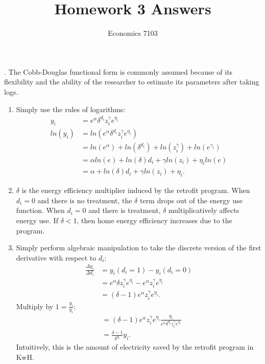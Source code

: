 \documentclass{article}
\title{Homework 3 Answers}
\author{Economics 7103}
\date{}
\begin{document}
  
\maketitle

. The Cobb-Douglas functional form is commonly assumed because of its flexibility and the ability of the researcher to estimate its parameters after taking logs.
\begin{enumerate}[label=(\alph*)]
    \item Simply use the rules of logarithms:
    \begin{align}
        y_i &= e^{\alpha} \delta^{d_i} z_i^{\gamma}  e^{\eta_i} \\
        ln(y_i) &= ln\left( e^{\alpha} \delta^{d_i} z_i^{\gamma}  e^{\eta_i} \right) \\
        & = ln\left( e^{\alpha} \right) + ln\left( \delta^{d_i} \right) + ln\left( z_i^\gamma \right) + ln\left( e^{\gamma_i} \right) \\
        & = \alpha ln(e) + ln(\delta)d_i + \gamma ln(z_i) + \eta_i ln(e) \\
        & = \alpha + ln(\delta) d_i + \gamma ln(z_i) + \eta_i.
    \end{align}
    \item $\delta$ is the energy efficiency multiplier induced by the retrofit program.  When $d_i = 0$ and there is no treatment, the $\delta$ term drops out of the energy use function.  When $d_i = 0$ and there is treatment, $\delta$ multiplicatively affects energy use.  If $\delta < 1$, then home energy efficiency increases due to the program.
    \item Simply perform algebraic manipulation to take the discrete version of the first derivative with respect to $d_i$:
    \begin{align}
        \frac{\Delta y_i}{\Delta d_i} & = y_i(d_i = 1) - y_i(d_i = 0) \\
        & = e^{\alpha} \delta z_i^{\gamma}  e^{\eta_i} - e^{\alpha} z_i^{\gamma}  e^{\eta_i} \\
        & = (\delta - 1) e^{\alpha} z_i^{\gamma}  e^{\eta_i}.
    \end{align}
    Multiply by $1 = \frac{y_i}{y_i}$:
    \begin{align}
        & = (\delta - 1) e^{\alpha} z_i^{\gamma}  e^{\eta_i} \frac{y_i}{e^{\alpha} \delta^{d_i} z_i^{\gamma}  e^{\eta_i}} \\
        & = \frac{\delta - 1}{\delta^{d_i}} y_i.
    \end{align}
    Intuitively, this is the amount of electricity saved by the retrofit program in KwH.

\end{enumerate}
\end{document}
